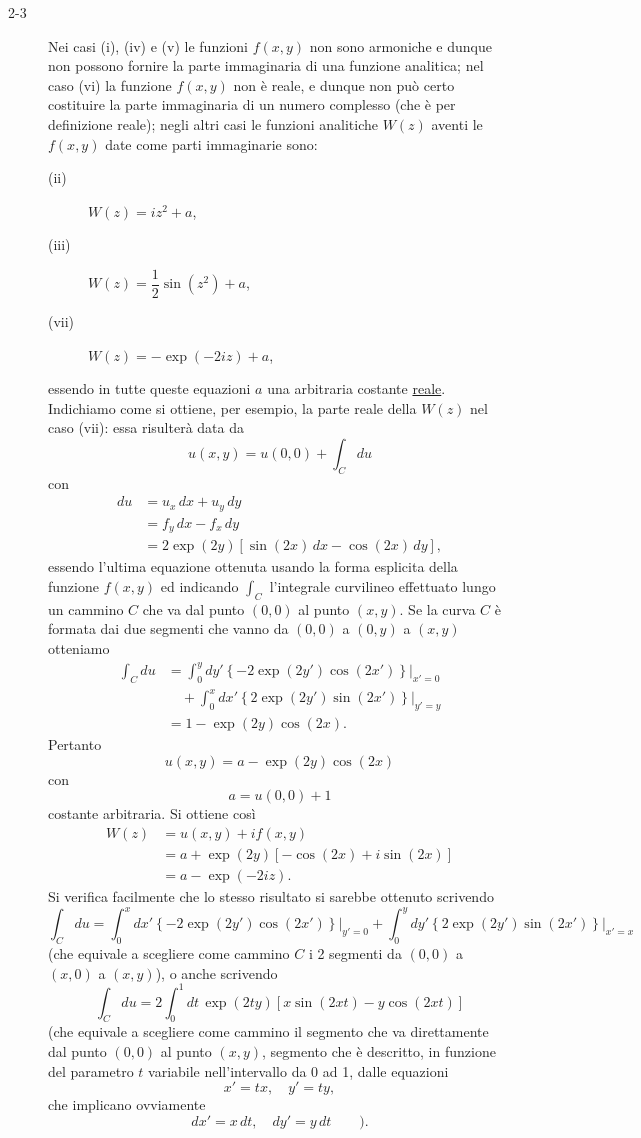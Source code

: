 \documentclass[11pt, a4paper]{book}
\numberwithin{equation}{section}
\begin{document}
\begin{description}
\item[2-3] Nei casi (i), (iv) e (v) le funzioni $f(x,y)$ non sono armoniche e dunque non possono fornire la parte immaginaria di una funzione analitica; nel caso (vi) la funzione $f(x,y)$ non è reale, e dunque non può certo costituire la parte immaginaria di un numero complesso (che è per definizione reale); negli altri casi le funzioni analitiche $W(z)$ aventi le $f(x,y)$ date come parti immaginarie sono:

\begin{description}
\item[(ii)] $W(z) = i z^2 + a$,
\item[(iii)] $W(z) = \dfrac{1}{2}\sin(z^2) + a$,
\item[(vii)] $W(z) = -\exp(-2iz) + a$,
\end{description}

essendo in tutte queste equazioni $a$ una arbitraria costante \uline{reale}. Indichiamo come si ottiene, per esempio, la parte reale della $W(z)$ nel caso (vii): essa risulterà data da
$$u(x,y) = u(0,0) + \int_C du$$
con
\begin{align*}
du &= u_x\, dx + u_y\, dy \\
&= f_y\, dx - f_x\, dy \\
&= 2\exp(2y)\left[\sin(2x)\, dx - \cos(2x)\, dy\right],
\end{align*}
essendo l'ultima equazione ottenuta usando la forma esplicita della funzione $f(x,y)$ ed indicando $\int_C$ l'integrale curvilineo effettuato lungo un cammino $C$ che va dal punto $(0,0)$ al punto $(x,y)$. Se la curva $C$ è formata dai due segmenti che vanno da $(0,0)$ a $(0,y)$ a $(x,y)$ otteniamo
\begin{align*}
\int_C du &= \int_0^y dy' \left\{-2\exp(2y')\cos(2x')\right\}\Big|_{x'=0} \\
&\quad + \int_0^x dx' \left\{2\exp(2y')\sin(2x')\right\}\Big|_{y'=y} \\
&= 1 - \exp(2y)\cos(2x).
\end{align*}
Pertanto
$$u(x,y) = a - \exp(2y)\cos(2x)$$
con
$$a = u(0,0) + 1$$
costante arbitraria. Si ottiene così
\begin{align*}
W(z) &= u(x,y) + i f(x,y) \\
&= a + \exp(2y)\left[-\cos(2x) + i\sin(2x)\right] \\
&= a - \exp(-2iz).
\end{align*}
Si verifica facilmente che lo stesso risultato si sarebbe ottenuto scrivendo
$$\int_C du = \int_0^x dx' \left\{-2\exp(2y')\cos(2x')\right\}\Big|_{y'=0} + \int_0^y dy' \left\{2\exp(2y')\sin(2x')\right\}\Big|_{x'=x}$$
(che equivale a scegliere come cammino $C$ i 2 segmenti da $(0,0)$ a $(x,0)$ a $(x,y)$), o anche scrivendo
$$\int_C du = 2\int_0^1 dt\, \exp(2ty)\left[x\sin(2xt) - y\cos(2xt)\right]$$
(che equivale a scegliere come cammino il segmento che va direttamente dal punto $(0,0)$ al punto $(x,y)$, segmento che è descritto, in funzione del parametro $t$ variabile nell'intervallo da 0 ad 1, dalle equazioni
$$x' = tx, \quad y' = ty,$$
che implicano ovviamente
$$dx' = x\, dt, \quad dy' = y\, dt \qquad).$$


\end{description}
\end{document}
